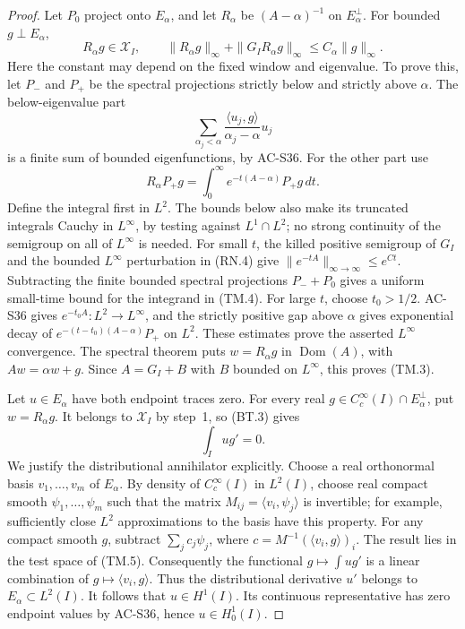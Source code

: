 \begin{proof}
Let \(P_0\) project onto \(E_\alpha\), and let
\(R_\alpha\) be \((A-\alpha)^{-1}\) on \(E_\alpha^\perp\).
For bounded \(g\perp E_\alpha\),
\[
       R_\alpha g\in\mathcal X_I,
 \qquad
 \|R_\alpha g\|_\infty+
            \|G_I R_\alpha g\|_\infty
                         \leq C_\alpha\|g\|_\infty.     \tag{TM.3}
\]
Here the constant may depend on the fixed window and eigenvalue.
To prove this, let \(P_-\) and \(P_+\) be the spectral
projections strictly below and strictly above \(\alpha\).
The below-eigenvalue part
\[
      \sum_{\alpha_j<\alpha}
              \frac{\langle u_j,g\rangle}{\alpha_j-\alpha}u_j
\]
is a finite sum of bounded eigenfunctions, by AC-S36.
For the other part use
\[
 R_\alpha P_+g
       =\int_0^\infty e^{-t(A-\alpha)}P_+g\,dt.          \tag{TM.4}
\]
Define the integral first in \(L^2\).  The bounds below also
make its truncated integrals Cauchy in \(L^\infty\), by testing
against \(L^1\cap L^2\); no strong continuity of the semigroup
on all of \(L^\infty\) is needed.
For small \(t\), the killed positive semigroup of \(G_I\)
and the bounded \(L^\infty\) perturbation in (RN.4) give
\(\|e^{-tA}\|_{\infty\to\infty}\leq e^{Ct}\).
Subtracting the finite bounded spectral projections
\(P_-+P_0\) gives a uniform small-time bound for the
integrand in (TM.4).
For large \(t\), choose \(t_0>1/2\).  AC-S36 gives
\(e^{-t_0A}:L^2\to L^\infty\), and the strictly positive
gap above \(\alpha\) gives exponential decay of
\(e^{-(t-t_0)(A-\alpha)}P_+\) on \(L^2\).
These estimates prove the asserted \(L^\infty\) convergence.
The spectral theorem puts \(w=R_\alpha g\) in
\(\operatorname{Dom}(A)\), with \(Aw=\alpha w+g\).
Since \(A=G_I+B\) with \(B\) bounded on \(L^\infty\),
this proves (TM.3).

Let \(u\in E_\alpha\) have both endpoint traces zero.
For every real \(g\in C_c^\infty(I)\cap E_\alpha^\perp\),
put \(w=R_\alpha g\).  It belongs to \(\mathcal X_I\)
by step~1, so (BT.3) gives
\[
                         \int_Iu g'=0.                  \tag{TM.5}
\]
We justify the distributional annihilator explicitly.
Choose a real orthonormal basis \(v_1,\ldots,v_m\) of
\(E_\alpha\).  By density of \(C_c^\infty(I)\) in \(L^2(I)\),
choose real compact smooth \(\psi_1,\ldots,\psi_m\)
such that the matrix
\(M_{ij}=\langle v_i,\psi_j\rangle\) is invertible;
for example, sufficiently close \(L^2\) approximations to
the basis have this property.
For any compact smooth \(g\), subtract
\(\sum_j c_j\psi_j\), where
\(c=M^{-1}(\langle v_i,g\rangle)_i\).
The result lies in the test space of (TM.5).
Consequently the functional \(g\mapsto\int ug'\)
is a linear combination of \(g\mapsto\langle v_i,g\rangle\).
Thus the distributional derivative \(u'\) belongs to
\(E_\alpha\subset L^2(I)\).
It follows that \(u\in H^1(I)\).
Its continuous representative has zero endpoint values by
AC-S36, hence \(u\in H^1_0(I)\).


\end{proof}
